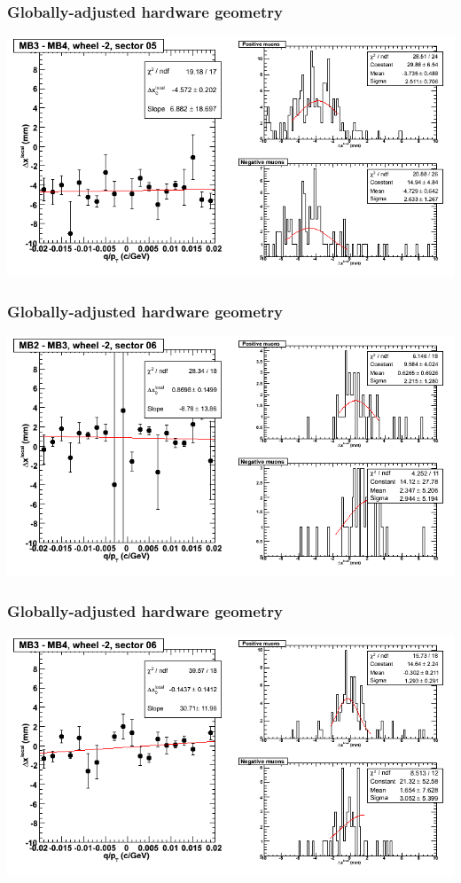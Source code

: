 \documentclass[compress]{beamer}
\begin{document}
\begin{frame}
\frametitle{Globally-adjusted hardware geometry}
\includegraphics[width=\linewidth]{NOV4_segdiffs_HW/dt13_resid_A_05_34.png}
\end{frame}

\begin{frame}
\frametitle{Globally-adjusted hardware geometry}
\includegraphics[width=\linewidth]{NOV4_segdiffs_HW/dt13_resid_A_06_23.png}
\end{frame}

\begin{frame}
\frametitle{Globally-adjusted hardware geometry}
\includegraphics[width=\linewidth]{NOV4_segdiffs_HW/dt13_resid_A_06_34.png}
\end{frame}
\end{document}
